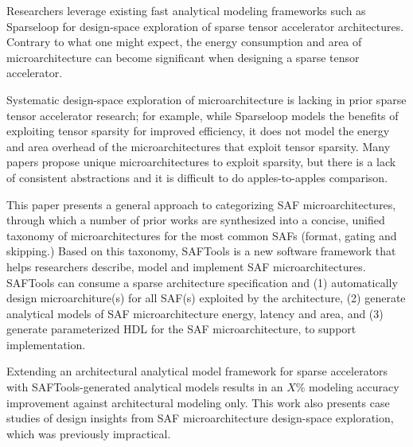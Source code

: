 % 
% 
%


Researchers leverage existing fast analytical modeling frameworks such as Sparseloop for design-space exploration of sparse tensor accelerator architectures. Contrary to what one might expect, the energy consumption and area of microarchitecture can become significant when designing a sparse tensor accelerator. 

Systematic design-space exploration of microarchitecture is lacking in prior sparse tensor accelerator research; for example, while Sparseloop models the benefits of exploiting tensor sparsity for improved efficiency, it does not model the energy and area overhead of the microarchitectures that exploit tensor sparsity. Many papers propose unique microarchitectures to exploit sparsity, but there is a lack of consistent abstractions and it is difficult to do apples-to-apples comparison.

This paper presents a general approach to categorizing SAF microarchitectures, through which a number of prior works are synthesized into a concise, unified taxonomy of microarchitectures for the most common SAFs (format, gating and skipping.) Based on this taxonomy, SAFTools is a new software framework that helps researchers describe, model and implement SAF microarchitectures. SAFTools can consume a sparse architecture specification and (1) automatically design microarchiture(s) for all SAF(s) exploited by the architecture, (2) generate analytical models of SAF microarchitecture energy, latency and area, and (3) generate parameterized HDL for the SAF microarchitecture, to support implementation.

Extending an architectural analytical model framework for sparse accelerators with SAFTools-generated analytical models results in an $X\%$ modeling accuracy improvement against architectural modeling only. This work also presents case studies of design insights from SAF microarchitecture design-space exploration, which was previously impractical.
